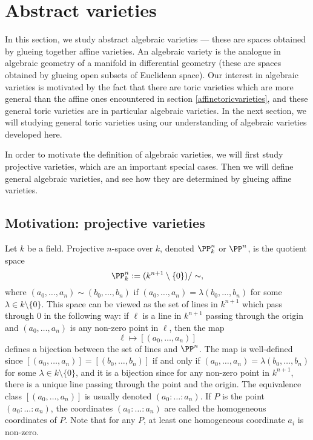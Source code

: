 \newpage
{}
\section{Abstract varieties}
In this section, we study abstract algebraic varieties --- these are spaces obtained by glueing together affine varieties.
An algebraic variety is the analogue in algebraic geometry of a manifold in differential geometry (these are spaces obtained by glueing open subsets of Euclidean space).
Our interest in algebraic varieties is motivated by the fact that there are toric varieties which are more general than the affine ones encountered in section \ref{affinetoricvarieties}, and these general toric varieties are in particular algebraic varieties. 
In the next section, we will studying general toric varieties using our understanding of algebraic varieties developed here.

In order to motivate the definition of algebraic varieties, we will first study projective varieties, which are an important special cases.
Then we will define general algebraic varieties, and see how they are determined by glueing affine varieties.





\subsection{Motivation: projective varieties}
Let $k$ be a field.
Projective $n$-space over $k$, denoted $\PP^n_k$ or $\PP^n$, is the quotient space
$$\PP^n_k := (k^{n+1} \setminus \{0\}) / \sim,$$
where $(a_0, \ldots, a_{n}) \sim (b_0, \ldots, b_{n})$ if $(a_0, \ldots, a_n) = \lambda (b_0, \ldots, b_n)$ for some $\lambda \in k \setminus \{0\}$.
This space can be viewed as the set of lines in $k^{n+1}$ which pass through $0$ in the following way:
if $\ell$ is a line in $k^{n+1}$ passing through the origin and $(a_0, \ldots, a_n)$ is any non-zero point in $\ell$, then the map
$$\ell \mapsto [(a_0, \ldots, a_n)]$$
defines a bijection between the set of lines and $\PP^n$.
The map is well-defined since $[(a_0, \ldots, a_n)] = [(b_0, \ldots, b_n)]$ if and only if $(a_0, \ldots, a_n) = \lambda (b_0, \ldots, b_n)$ for some $\lambda \in k \setminus \{0\}$, and it is a bijection since for any non-zero point in $k^{n+1}$, there is a unique line passing through the point and the origin.
The equivalence class $[(a_0, \ldots, a_n)]$ is usually denoted $(a_0 : \ldots : a_n)$.
If $P$ is the point $(a_0 : \ldots : a_n)$, the coordinates $(a_0 : \ldots : a_n)$ are called the homogeneous coordinates of $P$. 
Note that for any $P$, at least one homogeneous coordinate $a_i$ is non-zero.

